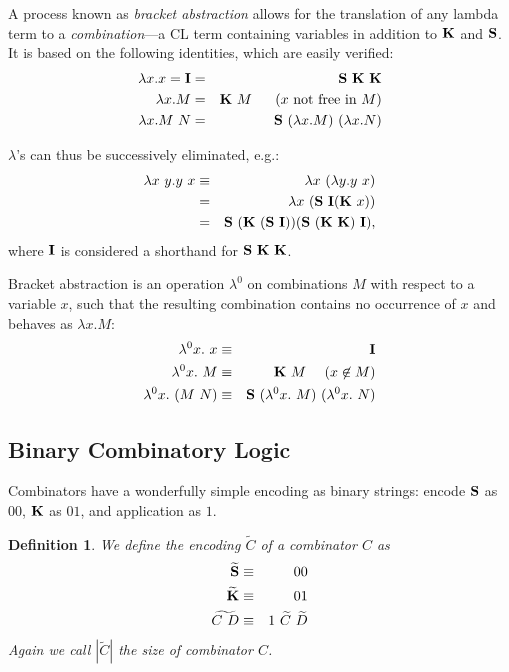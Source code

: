 \documentclass{article}
\newtheorem{definition}{Definition}
\newcommand{\baz}[1]{\lambda^0 #1.\ }
\newcommand{\CS}{{\bf S}}
\newcommand{\CK}{{\bf K}}
\newcommand{\CI}{{\bf I}}
\begin{document}
A process known as {\em bracket abstraction} allows for the translation
of any lambda term to a {\em combination}---a CL term
containing variables in addition to $\CK$ and $\CS$.
It is based on the following identities, which are easily verified:
\begin{eqnarray*}
\lambda x.x = \CI & = & \CS\ \CK\ \CK \\
\lambda x.M & = & \CK\ M \,\,\,\,\,\,\,\,\,\,(x \mbox{ not free in } M) \\
\lambda x.M\ N & = & \CS\ (\lambda x.M)\ (\lambda x.N)
\end{eqnarray*}

$\lambda$'s can thus be successively eliminated, e.g.:
\begin{eqnarray*}
\lambda x\ y.y\ x & \equiv & \lambda x\ (\lambda y.y\ x) \\
& = & \lambda x\ (\CS\ \CI (\CK\ x)) \\
& = & \CS\ (\CK\ (\CS\ \CI)) (\CS\ (\CK\ \CK)\ \CI),
\end{eqnarray*}
where $\CI$ is considered a shorthand for $\CS\ \CK\ \CK$.

Bracket abstraction is an operation $\lambda^0$ on combinations $M$
with respect to a variable $x$, such that the resulting combination
contains no occurrence of $x$ and behaves as $\lambda x.M$:
\begin{eqnarray*}
\baz{x}x & \equiv & \CI \\
\baz{x}M & \equiv & \CK\ M \,\,\,\,\,\,\,\,(x \not\in M) \\
\baz{x}(M\ N) & \equiv & \CS\ (\baz{x}M)\ (\baz{x}N)
\end{eqnarray*}

\subsection{Binary Combinatory Logic}
Combinators have a wonderfully simple encoding as binary strings:
encode $\CS$ as $00$, $\CK$ as $01$, and application as $1$.

\begin{definition}
We define the encoding $\widetilde{C}$ of a combinator $C$ as
\begin{eqnarray*}
\widetilde{\CS} & \equiv & 00 \\
\widetilde{\CK} & \equiv & 01 \\
\widetilde{C\ D} & \equiv & 1\ \widetilde{C}\ \widetilde{D}
\end{eqnarray*}
Again we call $|\widetilde{C}|$ the {\em size} of combinator $C$.
\end{definition}
\end{document}

